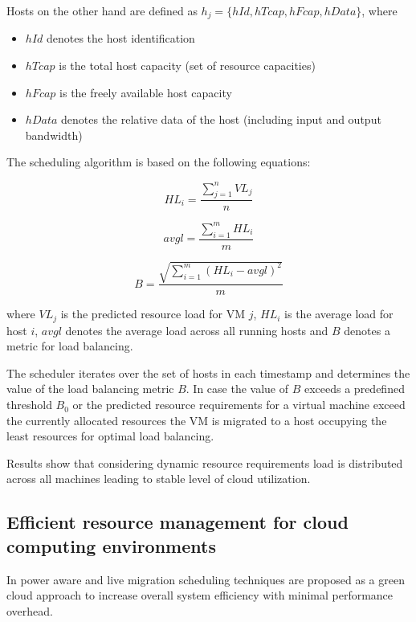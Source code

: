 Hosts on the other hand are defined as $h_j = \{hId, hTcap, hFcap, hData\}$, where

\begin{itemize}
	\item $hId$ denotes the host identification
	\item $hTcap$ is the total host capacity (set of resource capacities)
	\item $hFcap$ is the freely available host capacity
	\item $hData$ denotes the relative data of the host (including input and output bandwidth)
\end{itemize}


The scheduling algorithm is based on the following equations: 

\[ HL_i = \frac{\sum_{j=1}^{n}{VL_j}}{n} \]

\[ avgl = \frac{\sum_{i=1}^{m}{HL_i}}{m} \]

\[ B = \frac{\sqrt{\sum_{i=1}^{m}{(HL_i - avgl)^2}}}{m} \]

where $VL_j$ is the predicted resource load for VM $j$, $HL_i$ is the average load for host $i$, $avgl$ denotes the average
load across all running hosts and $B$ denotes a metric for load balancing. 

The scheduler iterates over the set of hosts in each timestamp and determines the value of the load balancing metric $B$. In case the value of 
$B$ exceeds a predefined threshold $B_0$ or the predicted resource requirements for a virtual machine exceed the currently allocated resources 
the VM is migrated to a host occupying the least resources for optimal load balancing. 

Results show that considering dynamic resource requirements load is distributed across all machines leading to stable level of cloud utilization. 



\subsection{Efficient resource management for cloud computing environments}

In \cite{younge2010efficient} power aware and live migration scheduling techniques are proposed as a green cloud approach to increase overall system efficiency with minimal performance overhead. 

